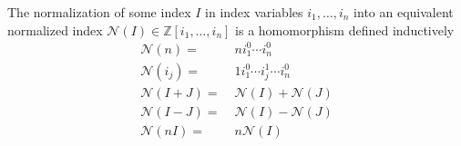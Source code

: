 %
\begin{defi}\label{def:normalizationindex}
The normalization of some index $I$ in index variables $i_1,\dots,i_n$ into an equivalent normalized index $\mathcal{N}(I)\in \mathbb{Z}[i_1,\dots,i_n]$ is a homomorphism defined inductively
    \begin{align*}
        \mathcal{N}(n) =&\; n i_1^0\cdots i_n^0\\
        \mathcal{N}(i_j) =&\; 1 i_1^0 \cdots i_j^1 \cdots i_n^0\\
        \mathcal{N}(I + J) =&\; \mathcal{N}(I) + \mathcal{N}(J)\\
        \mathcal{N}(I - J) =&\; \mathcal{N}(I) - \mathcal{N}(J)\\
        \mathcal{N}(n I) =&\; n \mathcal{N}(I)
    \end{align*}
\end{defi}



